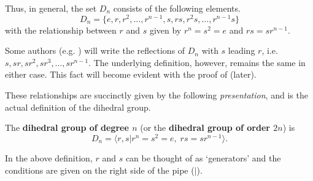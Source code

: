 Thus, in general, the set $D_n$ consists of the following elements.
\[
    D_n = \{e, r, r^2, \dots, r^{n-1}, s, rs, r^2s, \dots, r^{n-1}s\}
\]
with the relationship between $r$ and $s$ given by $r^n = s^2 = e$ and $rs = sr^{n-1}$.

\begin{remark}
    Some authors (e.g. {\cite[p.~25]{dummit_foote_2004}}) will write the reflections of $D_n$ with $s$ leading $r$, i.e. $s, sr, sr^2, sr^3, \dots, sr^{n-1}$. The underlying definition, however, remains the same in either case. This fact will become evident with the proof of  (later).
\end{remark}

These relationships are succinctly given by the following \textit{presentation}, and is the actual definition of the dihedral group.
\begin{definition}
    The \textbf{dihedral group of degree $n$} (or the \textbf{dihedral group of order $2n$}) is
    \[
        D_n = \langle r, s \vert r^n = s^2 = e,\;rs = sr^{n-1} \rangle.
    \]
\end{definition}
\begin{remark}
    In the above definition, $r$ and $s$ can be thought of as `generators' and the conditions are given on the right side of the pipe ($|$).
\end{remark}

